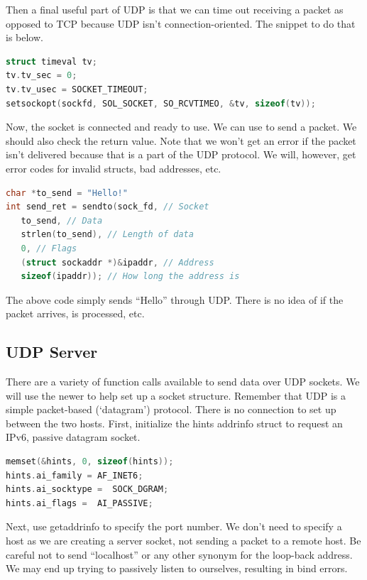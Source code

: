 Then a final useful part of UDP is that we can time out receiving a packet as opposed to TCP because UDP isn't connection-oriented.
The snippet to do that is below.

\begin{lstlisting}[language=C]
struct timeval tv;
tv.tv_sec = 0;
tv.tv_usec = SOCKET_TIMEOUT;
setsockopt(sockfd, SOL_SOCKET, SO_RCVTIMEO, &tv, sizeof(tv));
\end{lstlisting}

Now, the socket is connected and ready to use.
We can use  to send a packet.
We should also check the return value.
Note that we won't get an error if the packet isn't delivered because that is a part of the UDP protocol.
We will, however, get error codes for invalid structs, bad addresses, etc.

\begin{lstlisting}[language=C]
char *to_send = "Hello!"
int send_ret = sendto(sock_fd, // Socket
   to_send, // Data
   strlen(to_send), // Length of data
   0, // Flags
   (struct sockaddr *)&ipaddr, // Address
   sizeof(ipaddr)); // How long the address is
\end{lstlisting}

The above code simply sends ``Hello'' through UDP.
There is no idea of if the packet arrives, is processed, etc.

\subsection{UDP Server}

There are a variety of function calls available to send data over UDP sockets.
We will use the newer  to help set up a socket structure.
Remember that UDP is a simple packet-based (`datagram') protocol.
There is no connection to set up between the two hosts.
First, initialize the hints addrinfo struct to request an IPv6, passive datagram socket.

\begin{lstlisting}[language=C]
memset(&hints, 0, sizeof(hints));
hints.ai_family = AF_INET6;
hints.ai_socktype =  SOCK_DGRAM;
hints.ai_flags =  AI_PASSIVE;
\end{lstlisting}

Next, use getaddrinfo to specify the port number.
We don't need to specify a host as we are creating a server socket, not sending a packet to a remote host.
Be careful not to send ``localhost'' or any other synonym for the loop-back address.
We may end up trying to passively listen to ourselves, resulting in bind errors.

